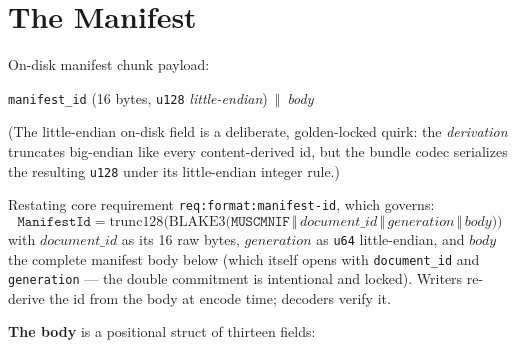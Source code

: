 \documentclass[11pt,letterpaper]{report}
\newcounter{requirement}[chapter]
\newcommand{\cat}{\ensuremath{\,\Vert\,}}
\begin{document}
\section{The Manifest}
\label{sec:bundle:manifest}

On-disk manifest chunk payload:

\begin{center}
\texttt{manifest\_id} (16 bytes, \texttt{u128} \emph{little-endian}) \cat{}
\emph{body}
\end{center}

(The little-endian on-disk field is a deliberate, golden-locked quirk: the
\emph{derivation} truncates big-endian like every content-derived id, but
the bundle codec serializes the resulting \texttt{u128} under its
little-endian integer rule.)

\begin{requirement}
\label{req:binfmt:manifest-id}
Restating core requirement \texttt{req:format:manifest-id}, which governs:
\[
  \texttt{ManifestId} = \mathrm{trunc128}\bigl(\mathrm{BLAKE3}(
  \texttt{MUSCMNIF} \cat \mathit{document\_id} \cat
  \mathit{generation} \cat \mathit{body}\bigr)\bigr)
\]
with $\mathit{document\_id}$ as its 16 raw bytes, $\mathit{generation}$ as
\texttt{u64} little-endian, and $\mathit{body}$ the complete manifest body
below (which itself opens with \texttt{document\_id} and
\texttt{generation} --- the double commitment is intentional and locked).
Writers re-derive the id from the body at encode time; decoders verify it.
\end{requirement}

\textbf{The body} is a positional struct of thirteen fields:
\end{document}
